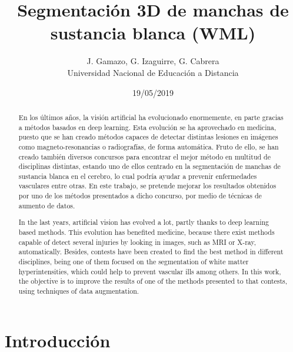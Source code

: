 \documentclass[12pt]{article}
\title{Segmentación 3D de manchas de sustancia blanca (WML)}
\date{19/05/2019}
\author{J. Gamazo, G. Izaguirre, G. Cabrera \\
	 Universidad Nacional de Educación a Distancia}
\begin{document}
	\maketitle
	\newpage
	\paragraph{}
	\newpage
	\tableofcontents
	\newpage
	
	\renewcommand{\abstractname}{Resumen}

	\begin{abstract}
	En los últimos años, la visión artificial ha evolucionado enormemente, en parte gracias a métodos basados en deep learning. Esta evolución se ha aprovechado en medicina, puesto que se han creado métodos capaces de detectar distintas lesiones en imágenes como magneto-resonancias o radiografías, de forma automática. Fruto de ello, se han creado también diversos concursos para encontrar el mejor método en multitud de disciplinas distintas, estando uno de ellos centrado en la segmentación de manchas de sustancia blanca en el cerebro, lo cual podría ayudar a prevenir enfermedades vasculares entre otras. En este trabajo, se pretende mejorar los resultados obtenidos por uno de los métodos presentados a dicho concurso, por medio de técnicas de aumento de datos.
	\end{abstract}
	
	
	\renewcommand{\abstractname}{\textit{Abstract}}
	
	\begin{abstract}
	In the last years, artificial vision has evolved a lot, partly thanks to deep learning based methods. This evolution has benefited medicine, because there exist methods capable of detect several injuries by looking in images, such as MRI or X-ray, automatically. Besides, contests have been created to find the best method in different disciplines, being one of them focused on the segmentation of white matter hyperintensities, which could help to prevent vascular ills among others. In this work, the objective is to improve the results of one of the methods presented to that contests, using techniques of data augmentation.
	\end{abstract}

	\newpage
	
	\section{Introducción}
\end{document}
